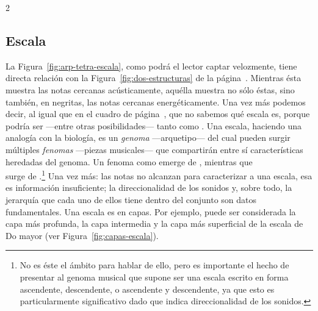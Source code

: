 \documentclass[a4paper,11pt]{article}
\begin{document}
\begin{multicols}{2}
  \subsection{Escala}\label{subsec:escala}
  La Figura~\ref{fig:arp-tetra-escala}, como podrá el lector captar velozmente, tiene directa relación con la Figura~\ref{fig:dos-estructuras} de la página~\pageref{fig:dos-estructuras}. Mientras ésta muestra las notas cercanas acústicamente, aquélla muestra no sólo éstas, sino también, en negritas, las notas cercanas energéticamente. Una vez más podemos decir, al igual que en el cuadro de página~\pageref{caja:notacion-escalas}, que  no sabemos qué escala es, porque podría ser ---entre otras posibilidades--- tanto  como \hbox{.} Una escala, haciendo una analogía con la biología, es un \emph{genoma} ---arquetipo--- del cual pueden surgir múltiples \emph{fenomas} ---piezas musicales--- que compartirán entre sí características heredadas del genoma. Un fenoma como  emerge de \hbox{,} mientras que \\
   surge de \hbox{.}\footnote{No es éste el ámbito para hablar de ello, pero es importante el hecho de presentar al genoma musical que supone ser una escala escrito en forma ascendente, descendente, o ascendente y descendente, ya que esto es particularmente significativo dado que indica direccionalidad de los sonidos.} Una vez más: las notas no alcanzan para caracterizar a una escala, esa es información insuficiente; la direccionalidad de los sonidos y, sobre todo, la jerarquía que cada uno de ellos tiene dentro del conjunto son datos fundamentales. Una escala es en capas. Por ejemplo,  puede ser considerada la capa más profunda,  la capa intermedia y  la capa más superficial de la escala de Do mayor (ver Figura~\ref{fig:capas-escala}).
\end{multicols}
\end{document}
